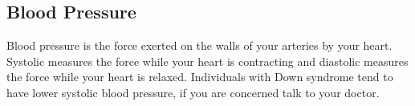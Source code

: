 \subsection{Blood Pressure}

Blood pressure is the force exerted on the walls of your arteries by your heart. Systolic measures the force while your heart is contracting and diastolic measures the force while your heart is relaxed. Individuals with Down syndrome tend to have lower systolic blood pressure, if you are concerned talk to your doctor. \\

\vspace{1cm}
